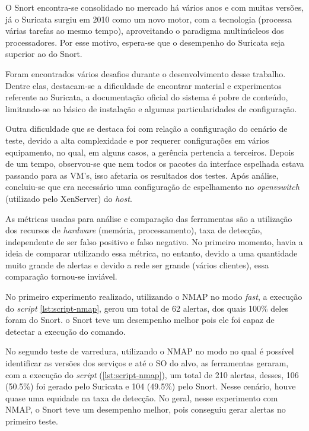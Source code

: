 O Snort encontra-se consolidado no mercado há vários anos e com muitas versões, já o Suricata surgiu em 2010 como um novo motor, com a tecnologia  (processa várias tarefas ao mesmo tempo), aproveitando o paradigma multinúcleos dos processadores. Por esse motivo, espera-se que o desempenho do Suricata seja superior ao do Snort.

Foram encontrados vários desafios durante o desenvolvimento desse trabalho. Dentre elas, destacam-se a dificuldade de encontrar material e experimentos referente ao Suricata, a documentação oficial do sistema é pobre de conteúdo, limitando-se ao básico de instalação e algumas particularidades de configuração. 

Outra dificuldade que se destaca foi com relação a configuração do cenário de teste, devido a alta complexidade e por requerer configurações em vários equipamento, no qual, em alguns casos, a gerência pertencia a terceiros. Depois de um tempo, observou-se que nem todos os pacotes da interface espelhada estava passando para as VM's, isso afetaria os resultados dos testes. Após análise, concluiu-se que era necessário uma configuração de espelhamento no \textit{openvswitch} (utilizado pelo XenServer) do \textit{host}. 

As métricas usadas para análise e comparação das ferramentas são a utilização dos recursos de \textit{hardware} (memória, processamento), taxa de detecção, independente de ser falso positivo e falso negativo. No primeiro momento, havia a ideia de comparar utilizando essa métrica, no entanto, devido a uma quantidade muito grande de alertas e devido a rede ser grande (vários clientes), essa comparação tornou-se inviável.

No primeiro experimento realizado, utilizando o NMAP no modo \textit{fast}, a execução do \textit{script} \autoref{lst:script-nmap}, gerou um total de 62 alertas, dos quais 100\% deles foram do Snort. o Snort teve um desempenho melhor pois ele foi capaz de detectar a execução do comando.

No segundo teste de varredura, utilizando o NMAP no modo no qual é possível identificar as versões dos serviços e até o SO do alvo, as ferramentas geraram, com a execução do \textit{script} (\autoref{lst:script-nmap}), um total de 210 alertas, desses, 106 (50.5\%) foi gerado pelo Suricata e 104 (49.5\%) pelo Snort. Nesse cenário, houve quase uma equidade na taxa de detecção. No geral, nesse experimento com NMAP, o Snort teve um desempenho melhor, pois conseguiu gerar alertas no primeiro teste.

